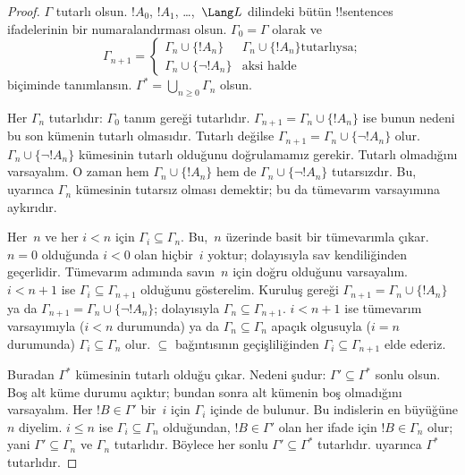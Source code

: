 \begin{proof}
$\Gamma$ tutarlı olsun. $!A_0$, $!A_1$, \dots,~$\Lang L$ dilindeki
bütün !!{sentence}s ifadelerinin bir numaralandırması olsun.
$\Gamma_0=\Gamma$ olarak ve
\[
\Gamma_{n+1} =
\begin{cases}
\Gamma_n \cup \{ !A_n \} & \textrm{$\Gamma_n \cup \{!A_n\}$
  tutarlıysa;} \\
\Gamma_n \cup \{ \lnot !A_n \} & \textrm{aksi halde}
\end{cases}
\]
biçiminde tanımlansın. $\Gamma^*=\bigcup_{n\geq0}\Gamma_n$ olsun.

Her $\Gamma_n$ tutarlıdır: $\Gamma_0$ tanım gereği tutarlıdır.
$\Gamma_{n+1}=\Gamma_n\cup\{!A_n\}$ ise bunun nedeni bu son kümenin
tutarlı olmasıdır. Tutarlı değilse $\Gamma_{n+1}=\Gamma_n\cup
\{\lnot !A_n\}$ olur. $\Gamma_n\cup\{\lnot !A_n\}$ kümesinin tutarlı
olduğunu doğrulamamız gerekir. Tutarlı olmadığını varsayalım. O zaman
hem $\Gamma_n\cup\{!A_n\}$ hem de $\Gamma_n\cup\{\lnot !A_n\}$
tutarsızdır. Bu,
uyarınca $\Gamma_n$ kümesinin tutarsız olması demektir; bu da
tümevarım varsayımına aykırıdır.

Her~$n$ ve her $i<n$ için $\Gamma_i\subseteq\Gamma_n$. Bu,~$n$
üzerinde basit bir tümevarımla çıkar. $n=0$ olduğunda $i<0$ olan
hiçbir~$i$ yoktur; dolayısıyla sav kendiliğinden geçerlidir. Tümevarım
adımında savın~$n$ için doğru olduğunu varsayalım. $i<n+1$ ise
$\Gamma_i\subseteq\Gamma_{n+1}$ olduğunu gösterelim. Kuruluş gereği
$\Gamma_{n+1}=\Gamma_n\cup\{!A_n\}$ ya da
$\Gamma_{n+1}=\Gamma_n\cup\{\lnot !A_n\}$; dolayısıyla
$\Gamma_n\subseteq\Gamma_{n+1}$. $i<n+1$ ise tümevarım varsayımıyla
($i<n$ durumunda) ya da $\Gamma_n\subseteq\Gamma_n$ apaçık olgusuyla
($i=n$ durumunda) $\Gamma_i\subseteq\Gamma_n$ olur. $\subseteq$
bağıntısının geçişliliğinden $\Gamma_i\subseteq\Gamma_{n+1}$ elde
ederiz.

Buradan $\Gamma^*$ kümesinin tutarlı olduğu çıkar. Nedeni şudur:
$\Gamma'\subseteq\Gamma^*$ sonlu olsun. Boş alt küme durumu açıktır;
bundan sonra alt kümenin boş olmadığını varsayalım. Her
$!B\in\Gamma'$ bir~$i$ için $\Gamma_i$ içinde de bulunur. Bu indislerin en büyüğüne
$n$ diyelim. $i\leq n$ ise $\Gamma_i\subseteq\Gamma_n$ olduğundan,
$!B\in\Gamma'$ olan her ifade için $!B\in\Gamma_n$ olur; yani
$\Gamma'\subseteq\Gamma_n$ ve $\Gamma_n$ tutarlıdır. Böylece
her sonlu $\Gamma'\subseteq\Gamma^*$ tutarlıdır.
uyarınca $\Gamma^*$ tutarlıdır.


\end{proof}
